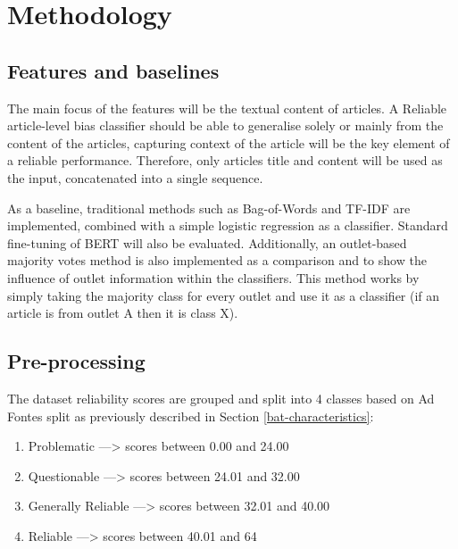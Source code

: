 \chapter{Methodology}
\label{cha:5}

\section{Features and baselines}

The main focus of the features will be the textual content of articles. A Reliable article-level bias classifier should be able to generalise solely or mainly from the content of the articles, capturing context of the article will be the key element of a reliable performance. Therefore, only articles title and content will be used as the input, concatenated into a single sequence.

As a baseline, traditional methods such as Bag-of-Words and TF-IDF are implemented, combined with a simple logistic regression as a classifier. Standard fine-tuning of BERT will also be evaluated. Additionally, an outlet-based majority votes method is also implemented as a comparison and to show the influence of outlet information within the classifiers. This method works by simply taking the majority class for every outlet and use it as a classifier (if an article is from outlet A then it is class X).

\section{Pre-processing}

The dataset reliability scores are grouped and split into 4 classes based on Ad Fontes split as previously described in Section \ref{bat-characteristics}:
\begin{enumerate}
    \item Problematic ---> scores between 0.00 and 24.00
    \item Questionable ---> scores between 24.01 and 32.00
    \item Generally Reliable ---> scores between 32.01 and 40.00
    \item Reliable ---> scores between 40.01 and 64
\end{enumerate}


